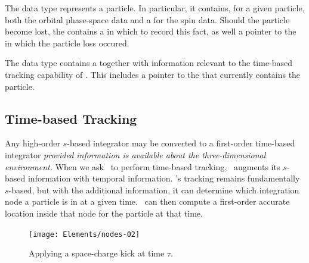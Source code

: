 %
The data type  represents a particle. In particular,
it contains, for a given particle, both the orbital phase-space data
and a  for the spin data. Should the particle become
lost, the  contains a  in which to
record this fact, as well a pointer to the 
in which the particle loss occured.

%
The data type  contains a 
together with information relevant to the time-based tracking
capability of \PTC. This includes a pointer to the
 that currently contains the particle.


\subsection{Time-based Tracking}
\label{sec:pseudo.time}

%
Any high-order $s$-based integrator may be converted to a
first-order time-based integrator \emph{provided information
is available about the three-dimensional environment.} When
we ask \PTC\ to perform time-based tracking, \PTC\ augments
its $s$-based information with temporal information. \PTC's
tracking remains fundamentally $s$-based, but with the
additional information, it can determine which integration
node a particle is in at a given time. \PTC\ can
then compute a first-order accurate location inside that node
for the particle at that time.

\begin{figure}[ht]
  \centering
  \texttt{[image: Elements/nodes-02]}
  \caption{Applying a space-charge kick at time $\tau$.}
  \label{fig:sc.kick}
\end{figure}


